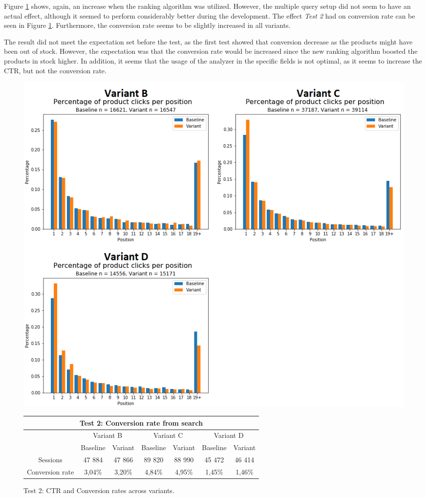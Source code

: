 Figure \ref{fig:search_v2} shows, again, an increase when the ranking algorithm was utilized.
However, the multiple query setup did not seem to have an actual effect, although it seemed to perform
considerably better during the development.
The effect \emph{Test 2} had on conversion rate can be seen in Figure \ref{fig:search_v2}.
Furthermore, the conversion rate seems to be slightly increased in all variants.

The result did not meet the expectation set before the test, as the first test showed that conversion decrease as the
products might have been out of stock.
However, the expectation was that the conversion rate would be increased since the new ranking algorithm 
boosted the products in stock higher.
In addition, it seems that the usage of the analyzer in the specific fields is not optimal, as it seems to increase
the CTR, but not the conversion rate.


\begin{figure}[p]
    \centering
    
    \includegraphics[width=\textwidth]{img/search_v2.png}

    \begin{tabular}{|c||c|c||c|c||c|c|}
    \hline
    \multicolumn{7}{|c|}{Test 2: Conversion rate from search} \\ \hline \hline
    & \multicolumn{2}{|c||}{Variant B} & \multicolumn{2}{|c||}{Variant C} & \multicolumn{2}{|c|}{Variant D} \\ \cline{2-7}
    & Baseline & Variant & Baseline & Variant & Baseline & Variant \\ \hline
    Sessions & 47 884 & 47 866 & 89 820 & 88 990 & 45 472 & 46 414 \\ \hline
    Conversion rate & 3,04\% & 3,20\% & 4,84\% & 4,95\% & 1,45\% & 1,46\% \\ \hline
    \end{tabular}

    \caption{Test 2: CTR and Conversion rates across variants.}
    \label{fig:search_v2}
\end{figure}



